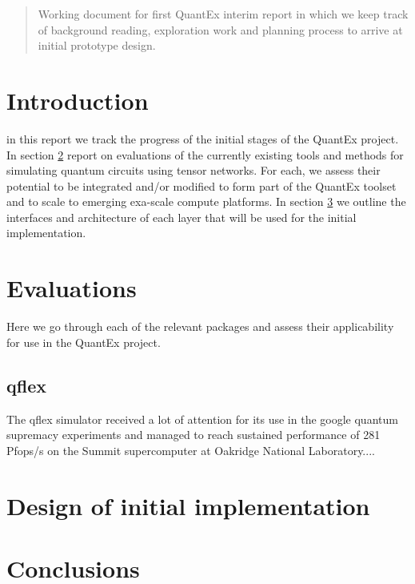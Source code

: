 \documentclass[12pt]{article}
\begin{document}
\maketitle

\begin{abstract}
Working document for first QuantEx interim report in which we keep track of
background reading, exploration work and planning process to arrive at initial
prototype design.
\end{abstract}

\section{Introduction}
in this report we track the progress of the initial stages of the QuantEx project. In section \ref{evaluations} report on evaluations of the currently existing tools and methods for simulating quantum circuits using tensor networks. For each, we assess their potential to be integrated and/or modified to form part of the QuantEx toolset and to scale to emerging exa-scale compute platforms. In section \ref{design} we outline the interfaces and architecture of each layer that will be used for the initial implementation.

\section{Evaluations}\label{evaluations}
Here we go through each of the relevant packages and assess their applicability for use in the QuantEx project.

\subsection{qflex}
The qflex simulator received a lot of attention for its use in the google quantum supremacy experiments \cite{Villalonga2019} and managed to reach sustained performance of 281 Pfops/s on the Summit supercomputer at Oakridge National Laboratory.... 

\section{Design of initial implementation}\label{design}

\section{Conclusions}\label{conclusions}



\end{document}
